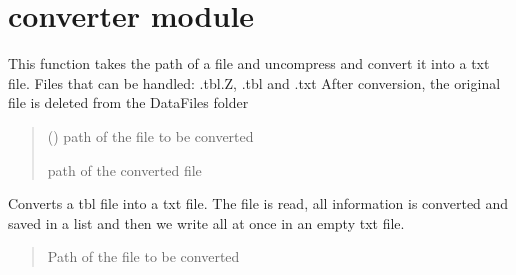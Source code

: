 \documentclass[letterpaper,10pt,english]{sphinxmanual}
\begin{document}
\sphinxstepscope


\chapter{converter module}
\label{\detokenize{converter:module-converter}}\label{\detokenize{converter:converter-module}}\label{\detokenize{converter::doc}}

\begin{fulllineitems}
\label{\detokenize{converter:converter.handle_file}}
\pysigstartsignatures
{}
\pysigstopsignatures
\sphinxAtStartPar
This function takes the path of a file and uncompress and convert it into a txt file.
Files that can be handled: .tbl.Z, .tbl and .txt
After conversion, the original file is deleted from the DataFiles folder
\begin{quote}\begin{description}
\sphinxAtStartPar
{} () \textendash{} path of the file to be converted

\sphinxAtStartPar
path of the converted file

\end{description}\end{quote}

\end{fulllineitems}


\begin{fulllineitems}
\label{\detokenize{converter:converter.tbl_to_txt}}
\pysigstartsignatures
{}
\pysigstopsignatures
\sphinxAtStartPar
Converts a tbl file into a txt file. The file is read, all information is converted and saved in a list and then we write all at once in an empty txt file.
\begin{quote}\begin{description}
\sphinxAtStartPar
{} \textendash{} Path of the file to be converted

\end{description}\end{quote}

\end{fulllineitems}
\end{document}
